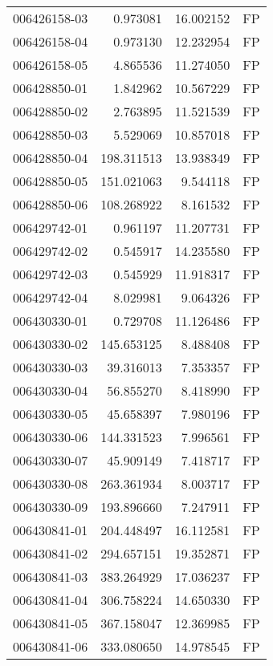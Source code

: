 \begin{tabular}{lrrl}
006426158-03 &    0.973081 &      16.002152 &   FP \\
006426158-04 &    0.973130 &      12.232954 &   FP \\
006426158-05 &    4.865536 &      11.274050 &   FP \\
006428850-01 &    1.842962 &      10.567229 &   FP \\
006428850-02 &    2.763895 &      11.521539 &   FP \\
006428850-03 &    5.529069 &      10.857018 &   FP \\
006428850-04 &  198.311513 &      13.938349 &   FP \\
006428850-05 &  151.021063 &       9.544118 &   FP \\
006428850-06 &  108.268922 &       8.161532 &   FP \\
006429742-01 &    0.961197 &      11.207731 &   FP \\
006429742-02 &    0.545917 &      14.235580 &   FP \\
006429742-03 &    0.545929 &      11.918317 &   FP \\
006429742-04 &    8.029981 &       9.064326 &   FP \\
006430330-01 &    0.729708 &      11.126486 &   FP \\
006430330-02 &  145.653125 &       8.488408 &   FP \\
006430330-03 &   39.316013 &       7.353357 &   FP \\
006430330-04 &   56.855270 &       8.418990 &   FP \\
006430330-05 &   45.658397 &       7.980196 &   FP \\
006430330-06 &  144.331523 &       7.996561 &   FP \\
006430330-07 &   45.909149 &       7.418717 &   FP \\
006430330-08 &  263.361934 &       8.003717 &   FP \\
006430330-09 &  193.896660 &       7.247911 &   FP \\
006430841-01 &  204.448497 &      16.112581 &   FP \\
006430841-02 &  294.657151 &      19.352871 &   FP \\
006430841-03 &  383.264929 &      17.036237 &   FP \\
006430841-04 &  306.758224 &      14.650330 &   FP \\
006430841-05 &  367.158047 &      12.369985 &   FP \\
006430841-06 &  333.080650 &      14.978545 &   FP \\

\end{tabular}
